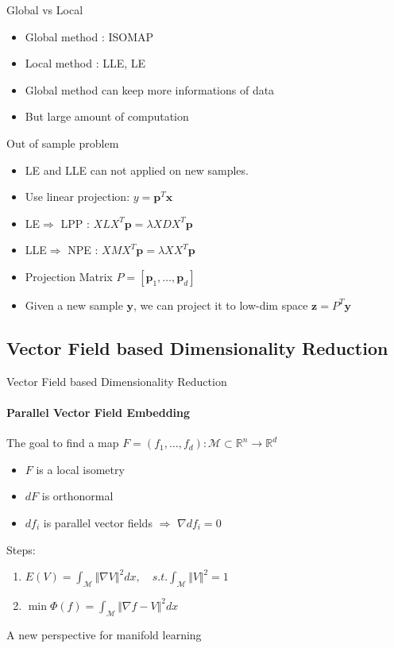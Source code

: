 \documentclass{beamer}
\newcommand{\bol}[1]{\textbf{#1}}
\begin{document}
\begin{darkframes}
    
    
	\begin{frame}{Global vs Local}
	\begin{itemize}
		\item Global method : ISOMAP\\
		\item Local method : LLE, LE\\
		\item Global method can keep more informations of data\\
		\item But large amount of computation
	\end{itemize}
	\end{frame}	    
    
    \begin{frame}{Out of sample problem}
    \begin{itemize}
    	\item LE and LLE can not applied on new samples. 
    	\item Use linear projection: $y = \bol{p}^T\bol{x}$
    	\item LE$\Rightarrow$ LPP : $XLX^T\bol{p} = \lambda XDX^T\bol{p}$
    	\item LLE$\Rightarrow$ NPE : $XMX^T\bol{p} = \lambda XX^T\bol{p}$
    	\item Projection Matrix $P = [\bol{p}_1, \ldots, \bol{p}_d]$
    	\item Given a new sample $\bol{y}$, we can project it to low-dim space $\bol{z} = P^T\bol{y}$
    \end{itemize}
    
    \end{frame}
    
   \subsection{Vector Field based Dimensionality Reduction}
   \begin{frame}{Vector Field based Dimensionality Reduction}
   \framesubtitle{Parallel Vector Field Embedding}
   The goal to find a map $F=(f_1,\ldots,f_d) : \mathcal{M} \subset \mathbb{R}^n \to \mathbb{R}^d$
   \begin{itemize}
   	\item $F$ is a local isometry
   	\item $dF$ is orthonormal
   	\item $df_i$ is parallel vector fields $\Rightarrow$ $\nabla df_i = 0$
   \end{itemize}
   Steps:
   \begin{enumerate}
   	\item $\displaystyle E(V) = \int_{\mathcal{M}}\Vert \nabla V \Vert^2dx,\quad  s.t. \int_{\mathcal{M}}\Vert V \Vert^2=1$
   	\item $\displaystyle\min\Phi(f) = \int_{\mathcal{M}}\Vert \nabla f - V \Vert^2dx$
   \end{enumerate}
   \alert{A new perspective for manifold learning}
	\end{frame}      
   

\end{darkframes}
\end{document}
